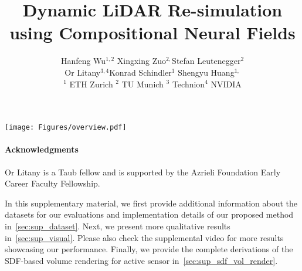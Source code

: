 \documentclass[10pt,twocolumn,letterpaper]{article}
\title{Dynamic LiDAR Re-simulation using Compositional Neural Fields}
\author{
Hanfeng Wu$^{1,2}$ \quad Xingxing Zuo$^{2,}$\footnotemark[1]\quad Stefan Leutenegger$^{2}$\\ 
Or Litany$^{3,4}$\quad Konrad Schindler$^{1}$ \quad Shengyu Huang$^{1,}$\footnotemark[1]\\
{\small $^{1}$ ETH Zurich \quad $^{2}$ TU Munich \quad $^{3}$ Technion\quad $^{4}$ NVIDIA
}
}
\newcommand{\dynfl}{DyNFL\xspace}
\newcommand{\dynfl}{DyNFL\xspace}
\begin{document}
\renewcommand{\thefootnote}{*}
\maketitle
{}
\begin{figure*}[t]
    \centering
        \texttt{[image: Figures/overview.pdf]}
        
        \caption{
        Overview of \dynfl. Our method takes LiDAR scans and tracked bounding boxes of dynamic vehicles as input. \dynfl first decomposes the scene into a static background and $N$ dynamic vehicles, each modelled using a dedicated neural field. These neural fields are then composed to re-simulate LiDAR scans in dynamic scenes. Our composition technique supports various scene edits, including altering object trajectories, removing and adding reconstructed neural assets between scenes.
    }
    \label{fig:main}
\end{figure*}
\begin{abstract}


\end{abstract}




% 

% 





\paragraph{Acknowledgments}
Or Litany is a Taub fellow and is supported by the Azrieli Foundation Early Career Faculty Fellowship.

{\small


}
\clearpage
\setcounter{section}{0}
\renewcommand\thesection{\Alph{section}}
In this supplementary material, we first provide additional information about the datasets for our evaluations and implementation details of our proposed method in~\cref{sec:sup_dataset}. Next, we present more qualitative results in~\cref{sec:sup_visual}. Please also check the supplemental video for more results showcasing our performance. Finally, we provide the complete derivations of the SDF-based volume rendering for active sensor in~\cref{sec:sup_sdf_vol_render}. 




\end{document}
